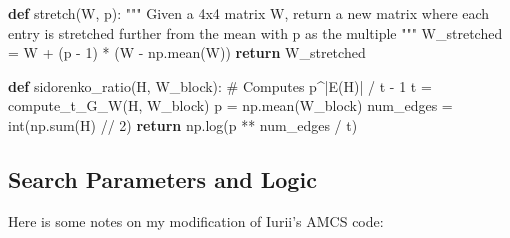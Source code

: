 \documentclass[
  letterpaper,
  DIV=11,
  numbers=noendperiod]{scrartcl}
\newenvironment{Shaded}{\begin{snugshade}}{\end{snugshade}}
\newcommand{\BuiltInTok}[1]{\textcolor[rgb]{0.00,0.23,0.31}{#1}}
\newcommand{\CommentTok}[1]{\textcolor[rgb]{0.37,0.37,0.37}{#1}}
\newcommand{\ControlFlowTok}[1]{\textcolor[rgb]{0.00,0.23,0.31}{\textbf{#1}}}
\newcommand{\DecValTok}[1]{\textcolor[rgb]{0.68,0.00,0.00}{#1}}
\newcommand{\KeywordTok}[1]{\textcolor[rgb]{0.00,0.23,0.31}{\textbf{#1}}}
\newcommand{\NormalTok}[1]{\textcolor[rgb]{0.00,0.23,0.31}{#1}}
\newcommand{\OperatorTok}[1]{\textcolor[rgb]{0.37,0.37,0.37}{#1}}
\begin{document}
\begin{Shaded}
\begin{Highlighting}[]
\KeywordTok{def}\NormalTok{ stretch(W, p):}
    \CommentTok{"""}
\CommentTok{    Given a 4x4 matrix W, return a new matrix where each entry is stretched further from the mean with p as the multiple}
\CommentTok{    """}
\NormalTok{    W\_stretched }\OperatorTok{=}\NormalTok{ W }\OperatorTok{+}\NormalTok{ (p }\OperatorTok{{-}} \DecValTok{1}\NormalTok{) }\OperatorTok{*}\NormalTok{ (W }\OperatorTok{{-}}\NormalTok{ np.mean(W))}
    \ControlFlowTok{return}\NormalTok{ W\_stretched}

\KeywordTok{def}\NormalTok{ sidorenko\_ratio(H, W\_block):}
    \CommentTok{\# Computes p\^{}|E(H)| / t {-} 1}
\NormalTok{    t }\OperatorTok{=}\NormalTok{ compute\_t\_G\_W(H, W\_block)}
\NormalTok{    p }\OperatorTok{=}\NormalTok{ np.mean(W\_block)}
\NormalTok{    num\_edges }\OperatorTok{=} \BuiltInTok{int}\NormalTok{(np.}\BuiltInTok{sum}\NormalTok{(H) }\OperatorTok{//} \DecValTok{2}\NormalTok{)}
    \ControlFlowTok{return}\NormalTok{ np.log(p }\OperatorTok{**}\NormalTok{ num\_edges }\OperatorTok{/}\NormalTok{ t)}
\end{Highlighting}
\end{Shaded}

\subsection{Search Parameters and
Logic}\label{search-parameters-and-logic}

Here is some notes on my modification of Iurii's AMCS code:
\end{document}
